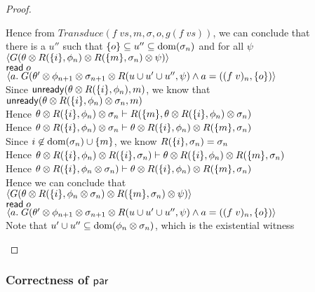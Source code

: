 \begin{proof}
\begin{tabbedproof}
\oo Hence from $\mathit{Transduce}(f\;vs, m, \sigma, o, g(f\;vs))$, we can conclude that \\
\oo there is a $u''$ such that $\{{o}\} \subseteq u'' \subseteq \mbox{dom}({\sigma_n})$ and for all $\psi$ \\
\ox $\left<G(\theta \otimes R(\{{i}\}, \phi_n) \otimes R(\{{m}\}, \sigma_n) \otimes \psi)\right>$ \\
\ox $\mathsf{read}\; o$ \\
\ox $\left<a.\;G(\theta' \otimes \phi_{n+1} \otimes \sigma_{n+1} \otimes R(u \cup u' \cup u'',\psi)
             \land a = ((f\;v)_n, \{{o}\})\right>$ \\
\oo Since $\mathsf{unready}({\theta \otimes R(\{{i}\}, \phi_n)}, {m})$, we know that \\
\oo $\mathsf{unready}({\theta \otimes R(\{{i}\}, \phi_n) \otimes \sigma_n}, {m})$ \\
\oo Hence $\theta \otimes R(\{{i}\}, \phi_n) \otimes \sigma_n \vdash R(\{{m}\}, \theta \otimes R(\{{i}\}, \phi_n) \otimes \sigma_n)$ \\
\oo Hence $\theta \otimes R(\{{i}\}, \phi_n) \otimes \sigma_n \vdash \theta \otimes R(\{{i}\}, \phi_n) \otimes R(\{{m}\}, \sigma_n)$ \\
\oo Since $i \not\in \mbox{dom}({\sigma_n}) \cup \{{m}\}$, we know $R(\{{i}\}, \sigma_n) = \sigma_n$ \\
\oo Hence $\theta \otimes R(\{{i}\}, \phi_n) \otimes R(\{{i}\}, \sigma_n) \vdash \theta \otimes R(\{{i}\}, \phi_n) \otimes R(\{{m}\}, \sigma_n)$ \\
\oo Hence $\theta \otimes R(\{{i}\}, \phi_n \otimes \sigma_n) \vdash \theta \otimes R(\{{i}\}, \phi_n) \otimes R(\{{m}\}, \sigma_n)$ \\
\oo Hence we can conclude that \\
\ox $\left<G(\theta \otimes R(\{{i}\}, \phi_n \otimes \sigma_n) \otimes R(\{{m}\}, \sigma_n) \otimes \psi)\right>$ \\
\ox $\mathsf{read}\; o$ \\
\ox $\left<a.\;G(\theta' \otimes \phi_{n+1} \otimes \sigma_{n+1} \otimes R(u \cup u' \cup u'',\psi)
             \land a = ((f\;v)_n, \{{o}\})\right>$ \\
\oo Note that $u' \cup u'' \subseteq \mbox{dom}({\phi_n \otimes \sigma_n})$, which is the existential witness
\end{tabbedproof}
\end{proof}

\subsubsection{Correctness of $\mathsf{par}$}

